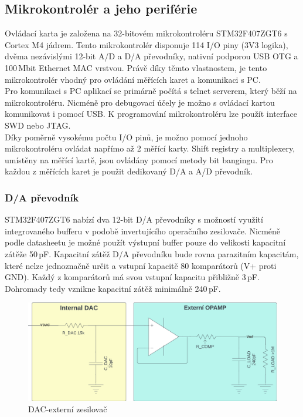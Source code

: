     \subsection{Mikrokontrolér a jeho periférie}
    Ovládací karta je založena na 32-bitovém mikrokontroléru STM32F407ZGT6 s Cortex M4 jádrem.
    Tento mikrokontrolér disponuje 114 I/O piny (3V3 logika), dvěma nezávislými 12-bit A/D a D/A převodníky,
    nativní podporou USB OTG a 100\,Mbit Ethernet MAC vrstvou. Právě díky těmto vlastnostem, je tento
    mikrokontrolér vhodný pro ovládání měřících karet a komunikaci s PC.\\

    Pro komunikaci s PC aplikací se primárně počítá s telnet serverem,
    který běží na mikrokontroléru. Nicméně pro debugovací
    účely je možno s ovládací kartou komunikovat i pomocí USB.
    K programování mikrokontroléru lze použít interface SWD nebo JTAG.\\

    Díky poměrně vysokému počtu I/O pinů,
    je možno pomocí jednoho mikrokontroléru ovládat napřímo až 2 měřící karty.
    Shift registry a multiplexery, umístěny na
    měřící kartě, jsou ovládány pomocí metody bit bangingu.
    Pro každou z měřících karet je použit dedikovaný D/A a A/D převodník\cite{MARTINT}.

    \subsubsection{D/A převodník}
    STM32F407ZGT6 nabízí dva 12-bit D/A převodníky s možností využití integrovaného bufferu v podobě
    invertujícího operačního zesilovače. Nicméně podle datasheetu
    je možné použít výstupní buffer pouze do velikosti kapacitní zátěže 50\,pF.
    Kapacitní zátěž D/A převodníku bude rovna parazitním kapacitám, které nelze jednoznačně určit
    a vstupní kapacitě 80 komparátorů (V+ proti GND). Každý z komparátorů má svou vstupní kapacitu
    přibližně 3\,pF. Dohromady tedy vznikne kapacitní zátěž minimálně 240\,pF.\cite{DAC}\\
    \begin{figure}[ht!]
        \centering
        \includegraphics[width = 1\textwidth]{obrazky/DAC_OPAMP.png}
        \caption{DAC-externí zesilovač}
        \label{fig: DAC-externí zesilovač}
        
    \end{figure}

